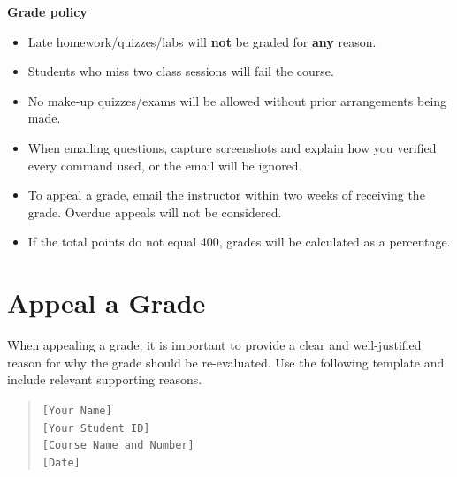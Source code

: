 \documentclass[10pt]{article}
\begin{document}
\begin{policybox}
  \textbf{Grade policy}
  \begin{itemize}
    \item Late homework/quizzes/labs will \textbf{not} be graded for \textbf{any} reason.
  \item Students who miss two class sessions will fail the course.
    \item No make-up quizzes/exams will be allowed without prior arrangements being made.
    \item When emailing questions, capture screenshots and explain how you verified every command used, or the email will be ignored.
    \item To appeal a grade, email the instructor within two weeks of receiving the grade. Overdue appeals will not be considered.
  \item If the total points do not equal 400, grades will be calculated as a percentage.
  \end{itemize}
\end{policybox}

\section{Appeal a Grade}
When appealing a grade, it is important to provide a clear and well-justified reason for why the grade should be re-evaluated. Use the following template and include relevant supporting reasons.

\begin{quote}
  \texttt{[Your Name]}\\
  \texttt{[Your Student ID]}\\
  \texttt{[Course Name and Number]}\\
  \texttt{[Date]}
\end{quote}
\end{document}
